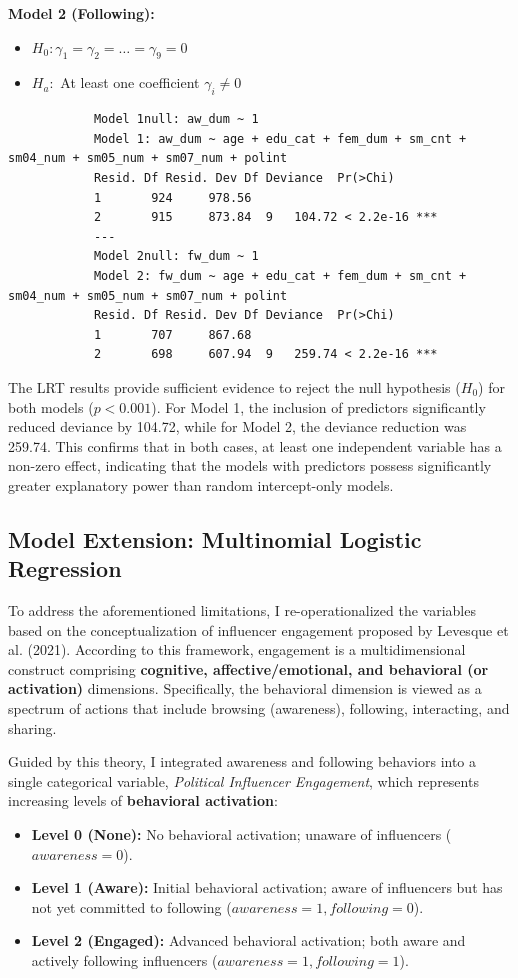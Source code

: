 \documentclass[12pt, a4paper]{article}
\begin{document}
	\textbf{Model 2 (Following):}
	\begin{itemize}[itemsep=0em]
		\item $H_0: \gamma_1 = \gamma_2 = \dots = \gamma_9 = 0$
		\item $H_a:$ At least one coefficient $\gamma_i \neq 0$
	\end{itemize}
	
	{\footnotesize
		\begin{verbatim}
			Model 1null: aw_dum ~ 1
			Model 1: aw_dum ~ age + edu_cat + fem_dum + sm_cnt + sm04_num + sm05_num + sm07_num + polint
			Resid. Df Resid. Dev Df Deviance  Pr(>Chi)    
			1       924     978.56                          
			2       915     873.84  9   104.72 < 2.2e-16 ***
			---
			Model 2null: fw_dum ~ 1
			Model 2: fw_dum ~ age + edu_cat + fem_dum + sm_cnt + sm04_num + sm05_num + sm07_num + polint
			Resid. Df Resid. Dev Df Deviance  Pr(>Chi)    
			1       707     867.68                          
			2       698     607.94  9   259.74 < 2.2e-16 ***
	\end{verbatim}}
    The LRT results provide sufficient evidence to reject the null hypothesis ($H_0$) for both models ($p < 0.001$). For Model 1, the inclusion of predictors significantly reduced deviance by 104.72, while for Model 2, the deviance reduction was 259.74. This confirms that in both cases, at least one independent variable has a non-zero effect, indicating that the models with predictors possess significantly greater explanatory power than random intercept-only models.
	
	\subsection{Model Extension: Multinomial Logistic Regression}
	To address the aforementioned limitations, I re-operationalized the variables based on the conceptualization of influencer engagement proposed by Levesque et al. (2021). According to this framework, engagement is a multidimensional construct comprising \textbf{cognitive, affective/emotional, and behavioral (or activation)} dimensions. Specifically, the behavioral dimension is viewed as a spectrum of actions that include browsing (awareness), following, interacting, and sharing.
	
	Guided by this theory, I integrated awareness and following behaviors into a single categorical variable, \textit{Political Influencer Engagement}, which represents increasing levels of \textbf{behavioral activation}:
	\begin{itemize}
		\item \textbf{Level 0 (None):} No behavioral activation; unaware of influencers ($awareness=0$).
		\item \textbf{Level 1 (Aware):} Initial behavioral activation; aware of influencers but has not yet committed to following ($awareness=1, following=0$).
		\item \textbf{Level 2 (Engaged):} Advanced behavioral activation; both aware and actively following influencers ($awareness=1, following=1$).
	\end{itemize}
	
\end{document}
